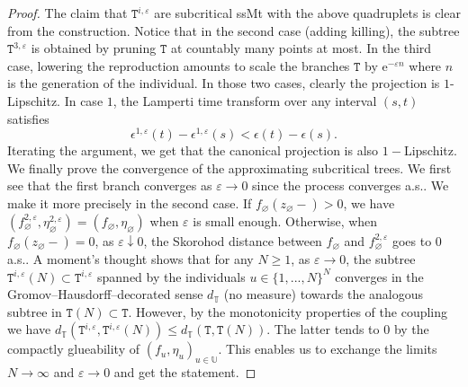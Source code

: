 \documentclass[12pt]{article}
\numberwithin{equation}{section}
\theoremstyle{plain}
\theoremstyle{definition}
\begin{document}
\begin{proof} The claim that $\mathtt{T}^{i, \varepsilon}$ are subcritical ssMt with the above quadruplets is clear from the construction. Notice that in the second case (adding killing), the subtree $\mathtt{T}^{3, \varepsilon}$ is obtained by pruning $\mathtt{T}$ at countably many points at most.  In the third case, lowering the reproduction amounts to scale the branches $\mathtt{T}$ by $\mathrm{e}^{- \varepsilon n}$ where $n$ is the generation of the individual. In those two cases, clearly the projection is $1$-Lipschitz. In case $1$, the Lamperti time transform over any interval $(s, t)$ satisfies $$\epsilon^{1,\varepsilon}(t) - \epsilon^{1,\varepsilon}(s)<\epsilon(t)- \epsilon(s).$$ Iterating the argument, we get that the canonical projection is also $1-$Lipschitz.  We finally prove the convergence of the approximating subcritical trees. We first see that the first branch converges as $\varepsilon\to 0$ since the process converges a.s.. We make it more precisely in the second case. If $f_{\varnothing}(z_{\varnothing}-)>0$, we have $(f^{2, \varepsilon}_{\varnothing}, \eta^{2, \varepsilon}_{\varnothing}) = (f_{\varnothing}, \eta_{\varnothing})$ when $\varepsilon$ is small enough. Otherwise, when $f_{\varnothing}(z_{\varnothing}-)=0$, as $\varepsilon\downarrow 0$, the Skorohod distance between $f_{\varnothing}$ and $f_{\varnothing}^{2,\varepsilon}$ goes to $0$ a.s.. A moment's thought shows that for any $N \geq 1$, as $ \varepsilon \to 0$, the subtree $\mathtt{T}^{i, \varepsilon}(N) \subset \mathtt{T}^{i, \varepsilon}$ spanned by the individuals $u \in \{1,... , N\}^{N}$ converges in the Gromov--Hausdorff--decorated sense $d_{\mathbb{T}}$ (no measure) towards the analogous subtree in $\mathtt{T}(N) \subset\mathtt{T}$. However, by the monotonicity properties of the coupling we have $ d_{\mathbb{T}}(\mathtt{T}^{i, \varepsilon}, \mathtt{T}^{i, \varepsilon}(N)) \leq d_{\mathbb{T}}(\mathtt{T}, \mathtt{T}(N))$. The latter tends to $0$ by the compactly glueability of $(f_u, \eta_u)_{u \in \mathbb{U}}$. This enables us to exchange the limits $N \to \infty$ and $ \varepsilon \to 0$ and get the statement.
\end{proof}
\end{document}
